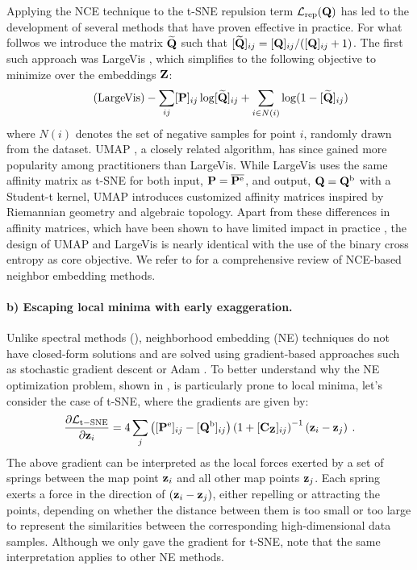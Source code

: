 Applying the NCE technique to the t-SNE repulsion term $\mathcal{L}_{\mathrm{rep}}({\mathbf{Q}})$ has led to the development of several methods that have proven effective in practice. For what follwos we introduce the matrix $\widetilde{{\mathbf{Q}}}$ such that $[\widetilde{{\mathbf{Q}}}]_{ij} = [{\mathbf{Q}}]_{ij} / ([{\mathbf{Q}}]_{ij} + 1)$. The first such approach was LargeVis \citep{tang2016visualizing}, which simplifies to the following objective to minimize over the embeddings ${\mathbf{Z}}$:
\begin{align}\label{eq:LargeVis_pb}\tag{LargeVis}
    - \sum_{ij} [{\mathbf{P}}]_{ij} \log [\widetilde{{\mathbf{Q}}}]_{ij} + \sum_{i \in N(i)} \log (1 - [\widetilde{{\mathbf{Q}}}]_{ij})
\end{align}
where $N(i)$ denotes the set of negative samples for point $i$, randomly drawn from the dataset. UMAP \citep{mcinnes2018umap}, a closely related algorithm, has since gained more popularity among practitioners than LargeVis. While LargeVis uses the same affinity matrix as t-SNE for both input, $ {\mathbf{P}} = \overline{{\mathbf{P}}^{\mathrm{e}}}$, and output, $ {\mathbf{Q}} = {\mathbf{Q}}^{\mathrm{b}}$ with a Student-t kernel, UMAP introduces customized affinity matrices inspired by Riemannian geometry and algebraic topology. Apart from these differences in affinity matrices, which have been shown to have limited impact in practice \citep{bohm2020unifying}, the design of UMAP and LargeVis is nearly identical with the use of the binary cross entropy as core objective. We refer to \citep{damrich2022t} for a comprehensive review of NCE-based neighbor embedding methods.


\paragraph{b) Escaping local minima with early exaggeration.} Unlike spectral methods (), neighborhood embedding (NE) techniques do not have closed-form solutions and are solved using gradient-based approaches such as stochastic gradient descent or Adam \citep{kingma2014adam}. To better understand why the NE optimization problem, shown in , is particularly prone to local minima, let's consider the case of t-SNE, where the gradients are given by:
\begin{align}
    \frac{\partial \mathcal{L}_{\mathrm{t-SNE}}}{\partial {\mathbf{z}}_i} = 4 \sum_j \left( [{\mathbf{P}}^{\mathrm{e}}]_{ij} - [{\mathbf{Q}}^{\mathrm{b}}]_{ij} \right) \left(1 + [\mathbf{C}_{{\mathbf{Z}}}]_{ij}\right)^{-1} \left( {\mathbf{z}}_i - {\mathbf{z}}_j \right) \:.
\end{align}
The above gradient can be interpreted as the local forces exerted by a set of springs between the map point ${\mathbf{z}}_i$ and all other map points ${\mathbf{z}}_j$. Each spring exerts a force in the direction of $({\mathbf{z}}_i - {\mathbf{z}}_j)$, either repelling or attracting the points, depending on whether the distance between them is too small or too large to represent the similarities between the corresponding high-dimensional data samples. Although we only gave the gradient for t-SNE, note that the same interpretation applies to other NE methods.

